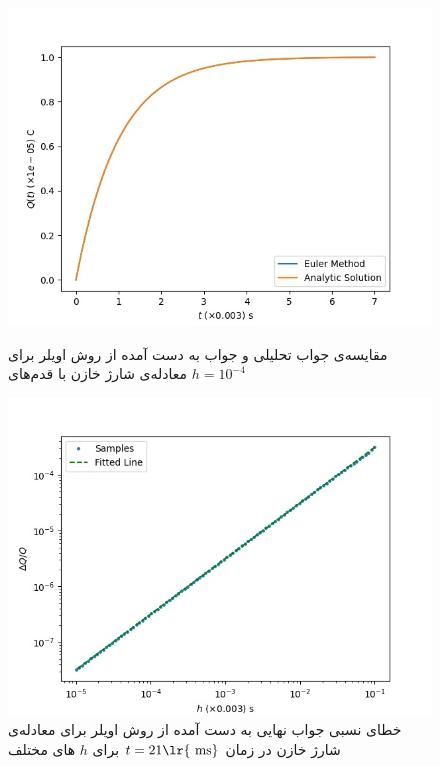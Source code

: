 \documentclass[11pt, a4paper]{article}
\begin{document}
\begin{figure}[h!]
	\centering
  \begin{minipage}[b]{0.48\textwidth}
    \includegraphics[width=\textwidth]{q1_euler_analytic_0_7.0_0.0001.jpg}
    \caption{مقایسه‌ی جواب تحلیلی و جواب به دست آمده از روش اویلر برای معادله‌ی شارژ خازن با قدم‌های $h = 10^{-4}$}
    \label{fig:q1_euler_analytic}
  \end{minipage}
  \hfill
  \begin{minipage}[b]{0.48\textwidth}
    \includegraphics[width=\textwidth]{q1_euler_error_0.1_1e-05_100_7.0.jpg}
    \caption{خطای نسبی جواب نهایی به دست آمده از روش اویلر برای معادله‌ی شارژ خازن در زمان $t = 21 \text{\lr{ ms}}$ برای $h$ های مختلف}
    \label{fig:q1_euler_error}
  \end{minipage}
\end{figure}
\end{document}
